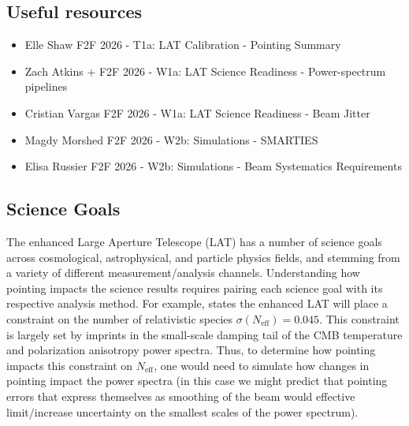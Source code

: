 \subsection{Useful resources}
\begin{itemize}
    \item Elle Shaw F2F 2026 - T1a: LAT Calibration - Pointing Summary 
    \item Zach Atkins + F2F 2026 - W1a: LAT Science Readiness - Power-spectrum pipelines
    \item Cristian Vargas F2F 2026 - W1a: LAT Science Readiness - Beam Jitter
    \item Magdy Morshed F2F 2026 - W2b: Simulations - SMARTIES
    \item Elisa Russier F2F 2026 - W2b: Simulations - Beam Systematics Requirements
\end{itemize}
\pagebreak

\subsection{Science Goals}

The enhanced Large Aperture Telescope (LAT) has a number of science goals across cosmological, astrophysical, and particle physics fields, and stemming from a variety of different measurement/analysis channels. Understanding how pointing impacts the science results requires pairing each science goal with its respective analysis method. For example, \cite{abitbol_simons_2025} states the enhanced LAT will place a constraint on the number of relativistic species $\sigma(N_\text{eff}) = 0.045$. This constraint is largely set by imprints in the small-scale damping tail of the CMB temperature and polarization anisotropy power spectra. Thus, to determine how pointing impacts this constraint on $N_\text{eff}$, one would need to simulate how changes in pointing impact the power spectra (in this case we might predict that pointing errors that express themselves as smoothing of the beam would effective limit/increase uncertainty on the smallest scales of the power spectrum).



